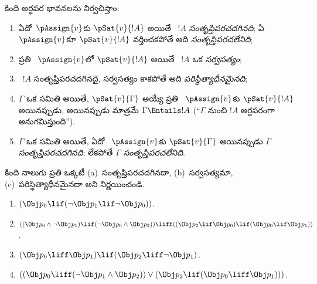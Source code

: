 \documentclass[../../../include/open-logic-section]{subfiles}
\begin{document}


కింది అర్థపర భావనలను నిర్వచిస్తాం:

\begin{defn}
\begin{enumerate}
\item ఏదో~$\pAssign{v}$కు $\pSat{v}{!A}$ అయితే
  ~$!A$ \emph{సంతృప్తిపరచదగినది}; ఏ
  $\pAssign{v}$కూ $\pSat{v}{!A}$ వర్తించకపోతే అది
  \emph{సంతృప్తిపరచలేనిది};
\item ప్రతి ~$\pAssign{v}$లో $\pSat{v}{!A}$ అయితే
  ~$!A$ ఒక \emph{సర్వసత్యం};
\item {}~$!A$ సంతృప్తిపరచదగినదై, సర్వసత్యం కాకపోతే అది
  \emph{పరిస్థిత్యాధీనమైనది};
\item $\Gamma$ ఒక  సమితి అయితే, $\pSat{v}{\Gamma}$ అయ్యే
  ప్రతి ~$\pAssign{v}$కు $\pSat{v}{!A}$ అయినప్పుడు,
  అయినప్పుడు మాత్రమే $\Gamma \Entails !A$ (“$\Gamma$ నుంచి $!A$
  అర్థపరంగా అనుగమిస్తుంది”).
\item $\Gamma$ ఒక  సమితి అయితే, ఏదో
  ~$\pAssign{v}$కు $\pSat{v}{\Gamma}$ అయినప్పుడు
  $\Gamma$ \emph{సంతృప్తిపరచదగినది}; లేకపోతే $\Gamma$
  \emph{సంతృప్తిపరచలేనిది}.
\end{enumerate}
\end{defn}

\begin{prob}
 కింది నాలుగు  ప్రతి ఒక్కటీ (a)~సంతృప్తిపరచదగినదా,
 (b)~సర్వసత్యమా, (c)~పరిస్థిత్యాధీనమైనదా అని నిర్ణయించండి.
\begin{enumerate}
  \item \( ( \Obj p_0 \lif ( \lnot \Obj p_1 \lif \lnot \Obj p_0 ) ) \).
  \item \( ( ( \Obj p_0 \land \lnot \Obj p_1 ) \lif ( \lnot \Obj p_0 \land \Obj p_2 )) \liff ( ( \Obj p_2 \lif \Obj p_0 ) \lif ( \Obj p_0 \lif \Obj p_1 )) \).
  \item \( ( \Obj p_0 \liff \Obj p_1 ) \lif ( \Obj p_2 \liff \lnot \Obj p_1 ) \).
  \item \( (( \Obj p_0 \liff ( \lnot \Obj p_1 \land \Obj p_2 )) \lor ( \Obj p_2 \lif ( \Obj p_0 \liff \Obj p_1 ))) \).
\end{enumerate}
\end{prob}
\end{document}
